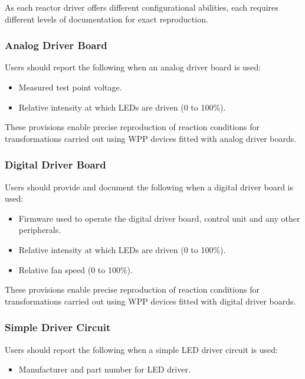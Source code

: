 \documentclass[11pt]{article}
\begin{document}
As each reactor driver offers different configurational abilities, each requires different levels of documentation for exact reproduction.

\subsubsection{Analog Driver Board } \label{SEC:doc-analog-driver}

Users should report the following when an analog driver board is used:

\begin{itemize}
	\item Measured test point voltage.
	\item Relative intensity at which LEDs are driven (0 to 100\%).
\end{itemize}

These provisions enable precise reproduction of reaction conditions for transformations carried out using WPP devices fitted with analog driver boards.

\subsubsection{Digital Driver Board} \label{SEC:doc-digital-driver}

Users should provide and document the following when a digital driver board is used:

\begin{itemize}
	\item Firmware used to operate the digital driver board, control unit and any other peripherals.
	\item Relative intensity at which LEDs are driven (0 to 100\%).
	\item Relative fan speed (0 to 100\%).
\end{itemize}

These provisions enable precise reproduction of reaction conditions for transformations carried out using WPP devices fitted with digital driver boards.

\subsubsection{Simple Driver Circuit} \label{SEC:doc-simple-driver}

Users should report the following when a simple LED driver circuit is used:

\begin{itemize}
	\item Manufacturer and part number for LED driver.
\end{itemize}
\end{document}
